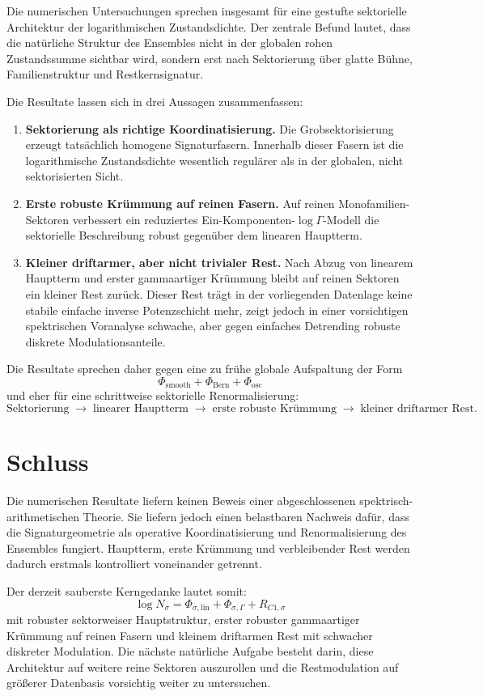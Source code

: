 \documentclass[11pt,a4paper]{article}
\theoremstyle{definition}
\theoremstyle{remark}
\begin{document}
Die numerischen Untersuchungen sprechen insgesamt für eine gestufte sektorielle Architektur der logarithmischen Zustandsdichte. Der zentrale Befund lautet, dass die natürliche Struktur des Ensembles nicht in der globalen rohen Zustandssumme sichtbar wird, sondern erst nach Sektorierung über glatte Bühne, Familienstruktur und Restkernsignatur.

Die Resultate lassen sich in drei Aussagen zusammenfassen:
\begin{enumerate}[label=\arabic*)]
\item \textbf{Sektorierung als richtige Koordinatisierung.} Die Grobsektorisierung erzeugt tatsächlich homogene Signaturfasern. Innerhalb dieser Fasern ist die logarithmische Zustandsdichte wesentlich regulärer als in der globalen, nicht sektorisierten Sicht.
\item \textbf{Erste robuste Krümmung auf reinen Fasern.} Auf reinen Monofamilien-Sektoren verbessert ein reduziertes Ein-Komponenten-\(\log\Gamma\)-Modell die sektorielle Beschreibung robust gegenüber dem linearen Hauptterm.
\item \textbf{Kleiner driftarmer, aber nicht trivialer Rest.} Nach Abzug von linearem Hauptterm und erster gammaartiger Krümmung bleibt auf reinen Sektoren ein kleiner Rest zurück. Dieser Rest trägt in der vorliegenden Datenlage keine stabile einfache inverse Potenzschicht mehr, zeigt jedoch in einer vorsichtigen spektrischen Voranalyse schwache, aber gegen einfaches Detrending robuste diskrete Modulationsanteile.
\end{enumerate}

Die Resultate sprechen daher gegen eine zu frühe globale Aufspaltung der Form
\[
\Phi_{\mathrm{smooth}}+\Phi_{\mathrm{Bern}}+\Phi_{\mathrm{osc}}
\]
und eher für eine schrittweise sektorielle Renormalisierung:
\[
\text{Sektorierung}
\;\longrightarrow\;
\text{linearer Hauptterm}
\;\longrightarrow\;
\text{erste robuste Krümmung}
\;\longrightarrow\;
\text{kleiner driftarmer Rest}.
\]

\section{Schluss}

Die numerischen Resultate liefern keinen Beweis einer abgeschlossenen spektrisch-arithmetischen Theorie. Sie liefern jedoch einen belastbaren Nachweis dafür, dass die Signaturgeometrie als operative Koordinatisierung und Renormalisierung des Ensembles fungiert. Hauptterm, erste Krümmung und verbleibender Rest werden dadurch erstmals kontrolliert voneinander getrennt.

Der derzeit sauberste Kerngedanke lautet somit:
\[
\boxed{
\log N_\sigma
=
\Phi_{\sigma,\mathrm{lin}}
+
\Phi_{\sigma,\Gamma}
+
R_{C1,\sigma}
}
\]
mit robuster sektorweiser Hauptstruktur, erster robuster gammaartiger Krümmung auf reinen Fasern und kleinem driftarmen Rest mit schwacher diskreter Modulation. Die nächste natürliche Aufgabe besteht darin, diese Architektur auf weitere reine Sektoren auszurollen und die Restmodulation auf größerer Datenbasis vorsichtig weiter zu untersuchen.
\end{document}
